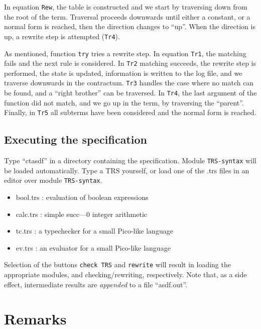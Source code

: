In equation {\tt Rew}, the table is constructed and we start by traversing
down from the root of the term. Traversal proceeds downwards until either
a constant, or a normal form is reached, then the direction changes to
``up''. When the direction is up, a rewrite step is attempted ({\tt Tr4}).

As mentioned, function {\tt try} tries a rewrite step. In equation {\tt Tr1},
the matching fails and the next rule is considered. In {\tt Tr2} matching
succeeds, the rewrite step is performed, the state is updated, information
is written to the log file, and we traverse downwards in the contractum.
{\tt Tr3} handles the case where no match can be found, and a ``right
brother'' can be traversed. In {\tt Tr4}, the last argument of the function
did not match, and we go up in the term, by traversing the ``parent''.
Finally, in {\tt Tr5} all subterms have been considered and the normal
form is reached.

\subsection{Executing the specification}

Type ``ctasdf'' in a directory containing the specification. Module
{\tt TRS-syntax} will be loaded automatically. Type a TRS yourself, or
load one of the \*.trs files in an editor over module {\tt TRS-syntax}.
\begin{itemize}
  \item bool.trs : evaluation of boolean expressions
  \item calc.trs : simple succ---0 integer arithmetic
  \item tc.trs : a typechecker for a small Pico-like language
  \item ev.trs : an evaluator for a small Pico-like language
\end{itemize}
Selection of the buttons {\tt check TRS} and {\tt rewrite} will result in
loading the appropriate modules, and checking/rewriting, respectively.
Note that, as a side effect, intermediate results are {\it appended} to a file
``asdf.out''.

\section{Remarks}

